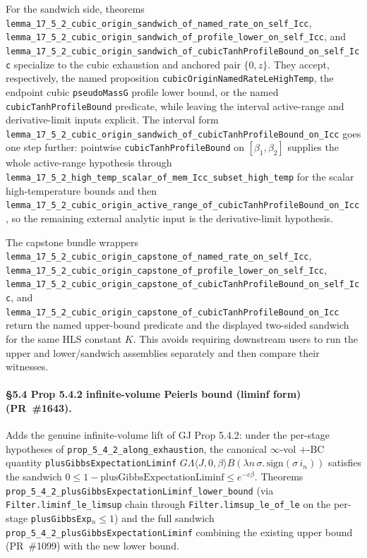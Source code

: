 \documentclass[a4paper,11pt]{article}
\begin{document}
For the sandwich side, theorems
\texttt{lemma\_17\_5\_2\_cubic\_origin\_sandwich\_of\_named\_rate\_on\_self\_Icc},
\texttt{lemma\_17\_5\_2\_cubic\_origin\_sandwich\_of\_profile\_lower\_on\_self\_Icc},
and
\texttt{lemma\_17\_5\_2\_cubic\_origin\_sandwich\_of\_cubicTanhProfileBound\_on\_self\_Icc}
specialize to the cubic exhaustion and anchored pair \(\{0,z\}\).  They accept,
respectively, the named proposition \texttt{cubicOriginNamedRateLeHighTemp}, the
endpoint cubic \texttt{pseudoMassG} profile lower bound, or the named
\texttt{cubicTanhProfileBound} predicate, while leaving the interval active-range
and derivative-limit inputs explicit.
The interval form
\texttt{lemma\_17\_5\_2\_cubic\_origin\_sandwich\_of\_cubicTanhProfileBound\_on\_Icc}
goes one step further: pointwise \texttt{cubicTanhProfileBound} on
\([\beta_1,\beta_2]\) supplies the whole active-range hypothesis through
\texttt{lemma\_17\_5\_2\_high\_temp\_scalar\_of\_mem\_Icc\_subset\_high\_temp}
for the scalar high-temperature bounds and then
\texttt{lemma\_17\_5\_2\_cubic\_origin\_active\_range\_of\_cubicTanhProfileBound\_on\_Icc},
so the remaining external analytic input is the derivative-limit hypothesis.

The capstone bundle wrappers
\texttt{lemma\_17\_5\_2\_cubic\_origin\_capstone\_of\_named\_rate\_on\_self\_Icc},
\texttt{lemma\_17\_5\_2\_cubic\_origin\_capstone\_of\_profile\_lower\_on\_self\_Icc},
\texttt{lemma\_17\_5\_2\_cubic\_origin\_capstone\_of\_cubicTanhProfileBound\_on\_self\_Icc},
and
\texttt{lemma\_17\_5\_2\_cubic\_origin\_capstone\_of\_cubicTanhProfileBound\_on\_Icc}
return the named upper-bound predicate and the displayed two-sided sandwich for
the same HLS constant \(K\).  This avoids requiring downstream users to run the
upper and lower/sandwich assemblies separately and then compare their witnesses.

\paragraph{\S5.4 Prop 5.4.2 infinite-volume Peierls bound (liminf form)
(PR~\#1643).} Adds the genuine infinite-volume lift of GJ Prop 5.4.2:
under the per-stage hypotheses of \texttt{prop\_5\_4\_2\_along\_exhaustion},
the canonical $\infty$-vol $+$-BC quantity
\texttt{plusGibbsExpectationLiminf} $G \Lambda \langle J, 0, \beta\rangle B
(\lambda n\,\sigma.\,\mathrm{sign}(\sigma\,i_n))$ satisfies the
sandwich
$0 \le 1 - \mathrm{plusGibbsExpectationLiminf} \le e^{-c\beta}$.
Theorems
\texttt{prop\_5\_4\_2\_plusGibbsExpectationLiminf\_lower\_bound}
(via \texttt{Filter.liminf\_le\_limsup} chain through
\texttt{Filter.limsup\_le\_of\_le} on the per-stage
\texttt{plusGibbsExp}$_n \le 1$) and the full sandwich
\texttt{prop\_5\_4\_2\_plusGibbsExpectationLiminf} combining the
existing upper bound (PR~\#1099) with the new lower bound.
\end{document}
